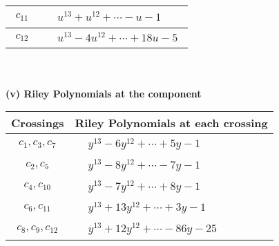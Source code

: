 \documentclass[1p]{elsarticle_modified}
\theoremstyle{definition}
\begin{document}
\begin{tabular}{m{50pt}|m{274pt}}
\hline $$\begin{aligned}c_{11}\end{aligned}$$&$\begin{aligned}
&u^{13}+u^{12}+\cdots- u-1
\end{aligned}$\\
\hline $$\begin{aligned}c_{12}\end{aligned}$$&$\begin{aligned}
&u^{13}-4 u^{12}+\cdots+18 u-5
\end{aligned}$\\
\hline
\end{tabular}\\~\\
\newpage\renewcommand{\arraystretch}{1}
\flushleft \textbf{(v) Riley Polynomials at the component}\newline \\
\begin{tabular}{m{50pt}|m{274pt}}
Crossings & \hspace{64pt}Riley Polynomials at each crossing \\
\hline $$\begin{aligned}c_{1},c_{3},c_{7}\end{aligned}$$&$\begin{aligned}
&y^{13}-6 y^{12}+\cdots+5 y-1
\end{aligned}$\\
\hline $$\begin{aligned}c_{2},c_{5}\end{aligned}$$&$\begin{aligned}
&y^{13}-8 y^{12}+\cdots-7 y-1
\end{aligned}$\\
\hline $$\begin{aligned}c_{4},c_{10}\end{aligned}$$&$\begin{aligned}
&y^{13}-7 y^{12}+\cdots+8 y-1
\end{aligned}$\\
\hline $$\begin{aligned}c_{6},c_{11}\end{aligned}$$&$\begin{aligned}
&y^{13}+13 y^{12}+\cdots+3 y-1
\end{aligned}$\\
\hline $$\begin{aligned}c_{8},c_{9},c_{12}\end{aligned}$$&$\begin{aligned}
&y^{13}+12 y^{12}+\cdots-86 y-25
\end{aligned}$\\
\hline
\end{tabular}\\~\\
\end{document}
